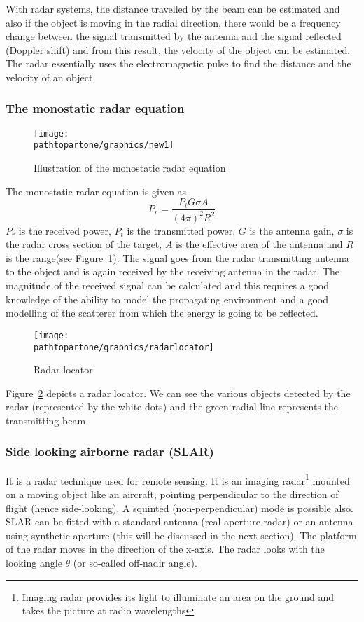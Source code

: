 With radar systems, the distance travelled by the beam can be estimated and also if the object is moving in the radial direction, there would be a frequency change between the signal transmitted by the antenna and the signal reflected (Doppler shift) and from this result, the velocity of the object can be estimated. The radar essentially uses the electromagnetic pulse to find the distance and the velocity of an object.

\subsubsection{The monostatic radar equation}
\begin{figure}[h]
\centering
\texttt{[image: \\pathtopartone/graphics/new1]}
\label{fig:new1}
\caption{Illustration of the monostatic radar equation}
\end{figure}

The monostatic radar equation is given as
\begin{dmath*}
P_{r}= \frac{P_t G\sigma A}{(4\pi)^{2}R^{2}}
\end{dmath*}
$P_{r}$ is the received power, $P_t$ is the transmitted power, $G$ is the antenna gain, $\sigma$ is the radar cross section of the target, $A$ is the effective area of the antenna and $R$ is the range(see  Figure~\ref{fig:new1}). The signal goes from the radar transmitting antenna to the object and is again received by the receiving antenna in the radar. The magnitude of the received signal can be calculated and this requires a good knowledge of the ability to model the propagating environment and a good modelling of the scatterer from which the energy is going to be reflected.

\begin{figure}[h]
\centering
\texttt{[image: \\pathtopartone/graphics/radarlocator]}
\caption{Radar locator}
\label{fig:radarlocator}
\end{figure}

Figure~\ref{fig:radarlocator} depicts a radar locator. We can see the various objects detected by the radar (represented by the white dots) and the green radial line represents the transmitting beam

\subsubsection{Side looking airborne radar (SLAR)} 
It is a radar technique used for remote sensing. It is an imaging radar\footnote{Imaging radar provides its light to illuminate an area on the ground and takes the picture at radio wavelengths} mounted on a moving object like an aircraft, pointing perpendicular to the direction of flight (hence side-looking). A squinted (non-perpendicular) mode is possible also. SLAR can be fitted with a standard antenna (real aperture radar) or an antenna using synthetic aperture (this will be discussed in the next section). The platform of the radar moves in the direction of the x-axis. The radar looks with the looking angle $\theta$ (or so-called off-nadir angle).

